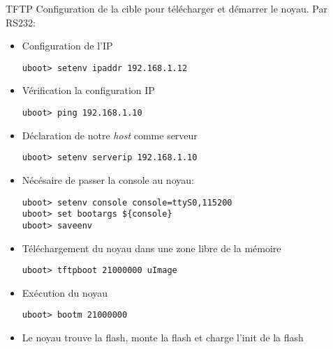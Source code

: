 \begin{frame}[fragile=singleslide]{TFTP}
  Configuration de la cible pour télécharger et démarrer le noyau. Par RS232:
  \begin{itemize}
  \item Configuration de l'IP
    \begin{lstlisting}
uboot> setenv ipaddr 192.168.1.12
    \end{lstlisting}
  \item Vérification la configuration IP
    \begin{lstlisting}
uboot> ping 192.168.1.10
    \end{lstlisting}
  \item Déclaration de notre \emph{host} comme serveur 
    \begin{lstlisting}
uboot> setenv serverip 192.168.1.10
    \end{lstlisting}
 \item Nécésaire de passer la console au noyau:
    \begin{lstlisting}
uboot> setenv console console=ttyS0,115200
uboot> set bootargs ${console}
uboot> saveenv
    \end{lstlisting}
  \item Téléchargement du noyau dans une zone libre de la mémoire
    \begin{lstlisting}
uboot> tftpboot 21000000 uImage
    \end{lstlisting}
  \item Exécution du noyau
    \begin{lstlisting}
uboot> bootm 21000000
    \end{lstlisting}
  \item Le noyau  trouve la flash, monte la flash  et charge l'init de
    la flash
  \end{itemize}
\end{frame}


